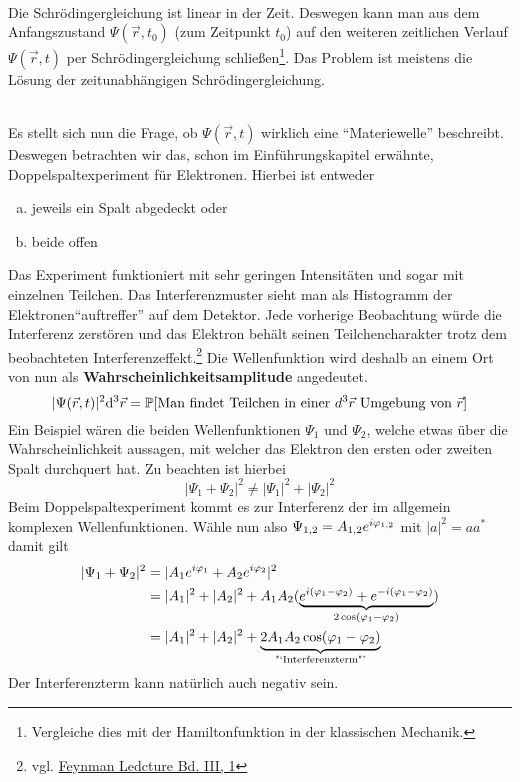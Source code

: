 \begin{bemerkung*}~\\
	Die Schrödingergleichung ist linear in der Zeit. Deswegen kann man aus dem Anfangszustand $\Psi(\vec{r}, t_0)$ (zum Zeitpunkt $t_0$) auf den weiteren zeitlichen Verlauf $\Psi(\vec{r}, t)$ per Schrödingergleichung schließen\footnote{Vergleiche dies mit der Hamiltonfunktion in der klassischen Mechanik.}. Das Problem ist meistens die Lösung der zeitunabhängigen Schrödingergleichung.
\end{bemerkung*}
\begin{bemerkung*}~\\
	Es stellt sich nun die Frage, ob $\Psi(\vec{r}, t)$ wirklich eine "`Materiewelle"' beschreibt. Deswegen betrachten wir das, schon im Einführungskapitel erwähnte, Doppelspaltexperiment für Elektronen. Hierbei ist entweder
	\begin{enumerate}[a)]
		\item jeweils ein Spalt abgedeckt oder
		\item beide offen
	\end{enumerate}
	Das Experiment funktioniert mit sehr geringen Intensitäten und sogar mit einzelnen Teilchen. Das Interferenzmuster sieht man als Histogramm der Elektronen"`auftreffer"' auf dem Detektor. Jede vorherige Beobachtung würde die Interferenz zerstören und das Elektron behält seinen Teilchencharakter trotz dem beobachteten Interferenzeffekt.\footnote{vgl. \href{http://www.feynmanlectures.caltech.edu/III\_01.html\#Ch1\-S1}{Feynman Ledcture Bd. III, 1}} Die Wellenfunktion wird deshalb an einem Ort von nun als \textbf{Wahrscheinlichkeitsamplitude} angedeutet.
	$$|\Psi(\vec{r}, t)|^2 \mathrm d^3 \vec{r} = \mathbb{P}[\text{Man findet Teilchen in einer $d^3 \vec{r}$ Umgebung von $\vec{r}$}]$$
	Ein Beispiel wären die beiden Wellenfunktionen $\Psi_{1}$ und $\Psi_2$, welche etwas über die Wahrscheinlichkeit aussagen, mit welcher das Elektron den ersten oder zweiten Spalt durchquert hat. Zu beachten ist hierbei
	$$|\Psi_1 + \Psi_2|^2 \neq |\Psi_1|^2 + |\Psi_2|^2$$
	Beim Doppelspaltexperiment kommt es zur Interferenz der im allgemein komplexen Wellenfunktionen. Wähle nun also $\Psi_{1,2}= A_{1,2} e^{i\varphi_{1,2}}$ mit $|a|^2 = a a^\ast$ damit gilt
	\begin{align*}
		|\Psi_1 + \Psi_2|^2 &= |A_1 e^{i\varphi_1} + A_2 e^{i \varphi_2}|^2\\
		&= |A_1|^2 + |A_2|^2 + A_1 A_2 (\underbrace{e^{i(\varphi_1 - \varphi_2)} + e^{-i(\varphi_1 - \varphi_2)}}_{2\cos(\varphi_1 - \varphi_2)})\\
		&= |A_1|^2 + |A_2|^2 + \underbrace{2 A_1 A_2 \cos(\varphi_1 - \varphi_2)}_{\text{"`Interferenzterm"'}}
	\end{align*}
	Der Interferenzterm kann natürlich auch negativ sein.
\end{bemerkung*}
